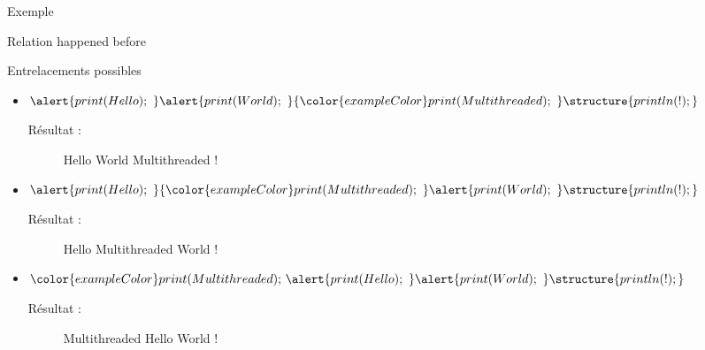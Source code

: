 \begin{frame}[fragile]{Exemple}

\begin{block}{Relation happened before}
\begin{center}
\end{center}
\end{block}

\begin{block}{Entrelacements possibles}
  \begin{itemize}
   \item $\alert{print(Hello);~ } \alert{print(World);~ } {\color{exampleColor}print(Multithreaded);~ } \structure{println(!); }$
  \begin{description}
   \item[Résultat :] Hello World Multithreaded !
  \end{description}
   \item\vspace{2mm} $\alert{print(Hello);~ } {\color{exampleColor}print(Multithreaded);~ } \alert{print(World);~ } \structure{println(!); }$
  \begin{description}
   \item[Résultat :] Hello Multithreaded World !
  \end{description}
   \item\vspace{2mm} ${\color{exampleColor}print(Multithreaded);~ } \alert{print(Hello);~ } \alert{print(World);~ } \structure{println(!); }$
  \begin{description}
   \item[Résultat :] Multithreaded Hello World !
  \end{description}
  \end{itemize}
\end{block}
\end{frame}

